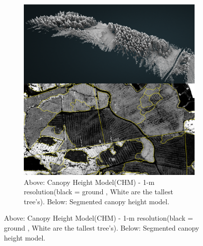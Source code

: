 \documentclass[a4paper,11pt,twoside]{report}
\begin{document}
\begin{figure}[ht]
\begin{subfigure}{.5\textwidth}
 \includegraphics[width=1\linewidth]{Images/3D_pointCloud.png}
  \caption{Above: Canopy Height Model(CHM) - 1-m resolution(black = ground , White are the tallest tree's).
  Below: Segmented canopy height model.}
  \label{fig:LIDAR_CLOUD}
\end{subfigure}
\end{figure}
\end{document}
